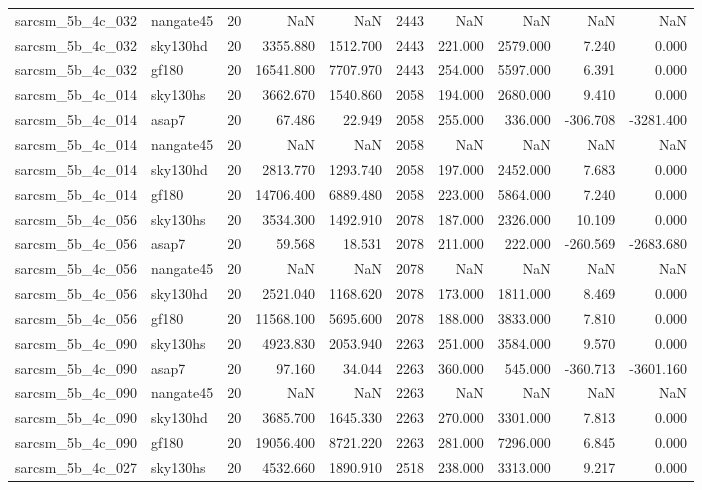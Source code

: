 \documentclass{article}
\begin{document}
\begin{longtable}{llrrrrrrrr}
sarcsm\_5b\_4c\_032 & nangate45 & 20 & NaN & NaN & 2443 & NaN & NaN & NaN & NaN \\
sarcsm\_5b\_4c\_032 & sky130hd & 20 & 3355.880 & 1512.700 & 2443 & 221.000 & 2579.000 & 7.240 & 0.000 \\
sarcsm\_5b\_4c\_032 & gf180 & 20 & 16541.800 & 7707.970 & 2443 & 254.000 & 5597.000 & 6.391 & 0.000 \\
sarcsm\_5b\_4c\_014 & sky130hs & 20 & 3662.670 & 1540.860 & 2058 & 194.000 & 2680.000 & 9.410 & 0.000 \\
sarcsm\_5b\_4c\_014 & asap7 & 20 & 67.486 & 22.949 & 2058 & 255.000 & 336.000 & -306.708 & -3281.400 \\
sarcsm\_5b\_4c\_014 & nangate45 & 20 & NaN & NaN & 2058 & NaN & NaN & NaN & NaN \\
sarcsm\_5b\_4c\_014 & sky130hd & 20 & 2813.770 & 1293.740 & 2058 & 197.000 & 2452.000 & 7.683 & 0.000 \\
sarcsm\_5b\_4c\_014 & gf180 & 20 & 14706.400 & 6889.480 & 2058 & 223.000 & 5864.000 & 7.240 & 0.000 \\
sarcsm\_5b\_4c\_056 & sky130hs & 20 & 3534.300 & 1492.910 & 2078 & 187.000 & 2326.000 & 10.109 & 0.000 \\
sarcsm\_5b\_4c\_056 & asap7 & 20 & 59.568 & 18.531 & 2078 & 211.000 & 222.000 & -260.569 & -2683.680 \\
sarcsm\_5b\_4c\_056 & nangate45 & 20 & NaN & NaN & 2078 & NaN & NaN & NaN & NaN \\
sarcsm\_5b\_4c\_056 & sky130hd & 20 & 2521.040 & 1168.620 & 2078 & 173.000 & 1811.000 & 8.469 & 0.000 \\
sarcsm\_5b\_4c\_056 & gf180 & 20 & 11568.100 & 5695.600 & 2078 & 188.000 & 3833.000 & 7.810 & 0.000 \\
sarcsm\_5b\_4c\_090 & sky130hs & 20 & 4923.830 & 2053.940 & 2263 & 251.000 & 3584.000 & 9.570 & 0.000 \\
sarcsm\_5b\_4c\_090 & asap7 & 20 & 97.160 & 34.044 & 2263 & 360.000 & 545.000 & -360.713 & -3601.160 \\
sarcsm\_5b\_4c\_090 & nangate45 & 20 & NaN & NaN & 2263 & NaN & NaN & NaN & NaN \\
sarcsm\_5b\_4c\_090 & sky130hd & 20 & 3685.700 & 1645.330 & 2263 & 270.000 & 3301.000 & 7.813 & 0.000 \\
sarcsm\_5b\_4c\_090 & gf180 & 20 & 19056.400 & 8721.220 & 2263 & 281.000 & 7296.000 & 6.845 & 0.000 \\
sarcsm\_5b\_4c\_027 & sky130hs & 20 & 4532.660 & 1890.910 & 2518 & 238.000 & 3313.000 & 9.217 & 0.000 \\

\end{longtable}
\end{document}
